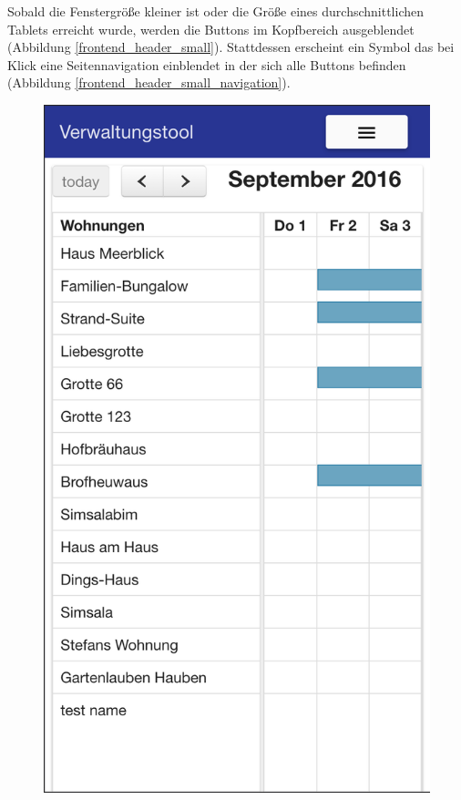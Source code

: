 Sobald die Fenstergröße kleiner ist oder die Größe eines durchschnittlichen Tablets erreicht wurde, werden die Buttons im Kopfbereich ausgeblendet
(Abbildung \ref{frontend_header_small}). Stattdessen erscheint ein Symbol das bei Klick eine Seitennavigation einblendet in der sich alle Buttons befinden
 (Abbildung \ref{frontend_header_small_navigation}).

\begin{figure}[H]
    \centering
    \begin{minipage}[t]{0.49\linewidth}
        \centering
        \includegraphics[width=\linewidth]{images/frontend_header_small.png}

\end{minipage}
\end{figure}
